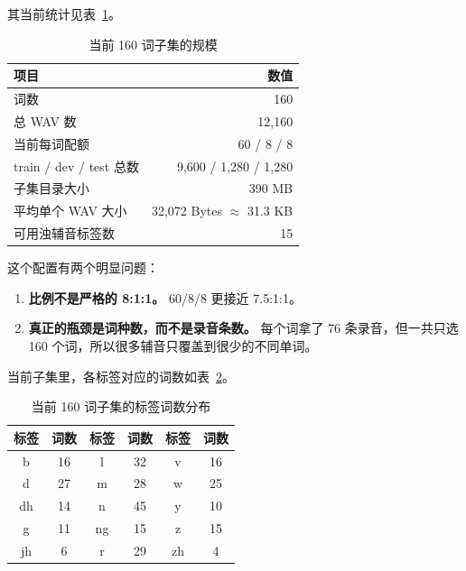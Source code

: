 \documentclass[11pt,a4paper]{ctexart}
\begin{document}
其当前统计见表~\ref{tab:current-subset}。

\begin{table}[H]
    \centering
    \caption{当前 160 词子集的规模}
    \label{tab:current-subset}
    \begin{tabular}{>{\raggedright\arraybackslash}p{7.5cm}r}
        \toprule
        项目 & 数值 \\
        \midrule
        词数 & 160 \\
        总 WAV 数 & 12,160 \\
        当前每词配额 & 60 / 8 / 8 \\
        train / dev / test 总数 & 9,600 / 1,280 / 1,280 \\
        子集目录大小 & 390 MB \\
        平均单个 WAV 大小 & 32,072 Bytes $\approx$ 31.3 KB \\
        可用浊辅音标签数 & 15 \\
        \bottomrule
    \end{tabular}
\end{table}

这个配置有两个明显问题：
\begin{enumerate}[nosep]
    \item \textbf{比例不是严格的 8:1:1。} 60/8/8 更接近 7.5:1:1。
    \item \textbf{真正的瓶颈是词种数，而不是录音条数。} 每个词拿了 76 条录音，但一共只选 160 个词，所以很多辅音只覆盖到很少的不同单词。
\end{enumerate}

当前子集里，各标签对应的词数如表~\ref{tab:current-labels}。

\begin{table}[H]
    \centering
    \caption{当前 160 词子集的标签词数分布}
    \label{tab:current-labels}
    \small
    \begin{tabular}{cccccc}
        \toprule
        标签 & 词数 & 标签 & 词数 & 标签 & 词数 \\
        \midrule
        b & 16 & l & 32 & v & 16 \\
        d & 27 & m & 28 & w & 25 \\
        dh & 14 & n & 45 & y & 10 \\
        g & 11 & ng & 15 & z & 15 \\
        jh & 6 & r & 29 & zh & 4 \\
        \bottomrule
    \end{tabular}
\end{table}
\end{document}
